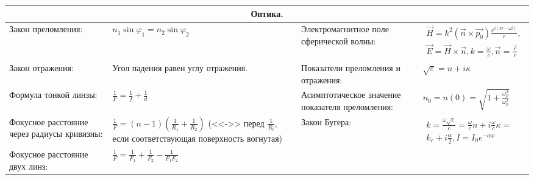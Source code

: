 \documentclass{article}
\begin{document}
\begin{tabular}{ |p{4.1cm}|p{5.4cm}|p{3.9cm}|p{5.6cm}|  }
\hline
\multicolumn{4}{|c|}{Оптика.} \\
\hline
Закон преломления:                                                           &  %
$n_1 \sin{\varphi_1} = n_2 \sin{\varphi_2}$                                  &  %
Электромагнитное поле сферической волны:                                     &  %
$\begin{aligned}
\vec{H} = k^2 (\vec{n} \times \vec{p_0}) \frac{e^{i(kr - \omega t)}}{r}, \\
\vec{E} = \vec{H} \times \vec{n}, k = \frac{\omega}{c},
\vec{n} = \frac{\vec{r}}{r}
\end{aligned}$                                                               \\ %
\hline
Закон отражения:                                                             &  %
Угол падения равен углу отражения.                                           &  %
Показатели преломления и отражения:                                          &  %
$\sqrt{\varepsilon} = n + i\kappa$                                           \\ %
\hline
Формула тонкой линзы:                                                        &  %
$\frac{1}{F} = \frac{1}{f} + \frac{1}{d}$                                    &  %
Асимптотическое значение показателя преломления:                             &  %
$n_0 = n(0) = \sqrt{1 + \frac{\omega_p^2}{\omega_0^2}}$                      \\ %
\hline
Фокусное расстояние через радиусы кривизны:                                  &  %
$\frac{1}{F} = (n-1)(\frac{1}{R_1} + \frac{1}{R_2})$ (<<->> перед
$\frac{1}{R_i}$, если соответствующая поверхность вогнутая)                  &  %
Закон Бугера:                                                                &  %
$\begin{aligned}
k = \frac{\omega \sqrt{\varepsilon}}{c} =
 \frac{\omega}{c}n + i \frac{\omega}{c} \kappa =    \\
 k_r + i \frac{\alpha}{2},
I = I_0 e^{-\alpha x}
\end{aligned}$                                                                             \\ %
\hline
Фокусное расстояние двух линз:                                               &  %
$\frac{1}{F} = \frac{1}{F_1} + \frac{1}{F_2} - \frac{1}{F_1 F_2}$            &  %

\end{tabular}
\end{document}
